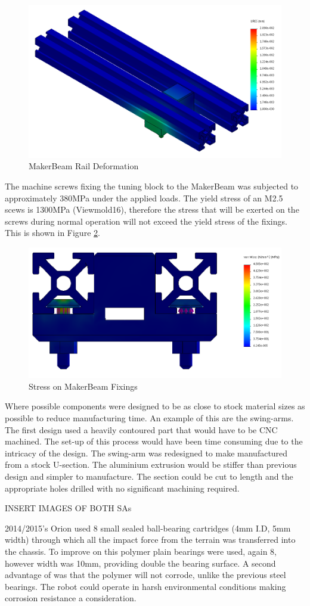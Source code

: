 \begin{figure}[h]
\centering\includegraphics[width=0.6\linewidth]{Images/MaxImages/Suspension_beam_sim_3.png}
\caption{MakerBeam Rail Deformation}
\label{fig:SuspensionSim3}
\end{figure}
The machine screws fixing the tuning block to the MakerBeam was subjected to approximately 380MPa under the applied loads. The yield stress of an M2.5 scews is 1300MPa (Viewmold16), therefore the stress that will be exerted on the screws during normal operation will not exceed the yield stress of the fixings. This is shown in Figure \ref{fig:SuspensionSim1}.
\begin{figure}[h]
\centering\includegraphics[width=0.6\linewidth]{Images/MaxImages/Suspension_beam_sim_1.png}
\caption{Stress on MakerBeam Fixings}
\label{fig:SuspensionSim1}
\end{figure}
Where possible components were designed to be as close to stock material sizes as possible to reduce manufacturing time. An example of this are the swing-arms. The first design used a heavily contoured part that would have to be CNC machined. The set-up of this process would have been time consuming due to the intricacy of the design. The swing-arm was redesigned to make manufactured from a stock U-section. The aluminium extrusion would be stiffer than previous design and simpler to manufacture. The section could be cut to length and the appropriate holes drilled with no significant machining required. 

INSERT IMAGES OF BOTH SAs

2014/2015’s Orion used 8 small sealed ball-bearing cartridges (4mm I.D, 5mm width) through which all the impact force from the terrain was transferred into the chassis. To improve on this polymer plain bearings were used, again 8, however width was 10mm, providing double the bearing surface. A second advantage of was that the polymer will not corrode, unlike the previous steel bearings. The robot could operate in harsh environmental conditions making corrosion resistance a consideration.

